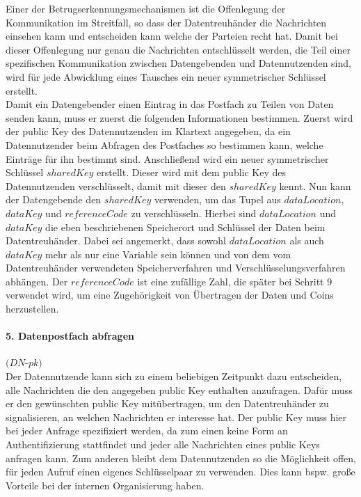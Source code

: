 \documentclass[11pt,a4paper]{scrreprt}
\begin{document}
Einer der Betrugserkennungsmechanismen ist die Offenlegung der Kommunikation im Streitfall, so dass der Datentreuhänder die Nachrichten einsehen kann und entscheiden kann welche der Parteien recht hat. Damit bei dieser Offenlegung nur genau die Nachrichten entschlüsselt werden, die Teil einer spezifischen Kommunikation zwischen Datengebenden und Datennutzenden sind, wird für jede Abwicklung eines Tausches ein neuer symmetrischer Schlüssel erstellt.\\

Damit ein Datengebender einen Eintrag in das Postfach zu Teilen von Daten senden kann, muss er zuerst die folgenden Informationen bestimmen. Zuerst wird der public Key des Datennutzenden im Klartext angegeben, da ein Datennutzender beim Abfragen des Postfaches so bestimmen kann, welche Einträge für ihn bestimmt sind. Anschließend wird ein neuer symmetrischer Schlüssel $sharedKey$ erstellt. Dieser wird mit dem public Key des Datennutzenden verschlüsselt, damit mit dieser den $sharedKey$ kennt. Nun kann der Datengebende den $sharedKey$ verwenden, um das Tupel aus $dataLocation$, $dataKey$ und $referenceCode$ zu verschlüsseln. Hierbei sind $dataLocation$ und $dataKey$ die eben beschriebenen Speicherort und Schlüssel der Daten beim Datentreuhänder. Dabei sei angemerkt, dass sowohl $dataLocation$ als auch $dataKey$ mehr als nur eine Variable sein können und von dem vom Datentreuhänder verwendeten Speicherverfahren und Verschlüsselungsverfahren abhängen. Der $referenceCode$ ist eine zufällige Zahl, die später bei Schritt 9 verwendet wird, um eine Zugehörigkeit von Übertragen der Daten und Coins herzustellen.

\paragraph{5. Datenpostfach abfragen} $(DN$-$pk)$\\
Der Datennutzende kann sich zu einem beliebigen Zeitpunkt dazu entscheiden, alle Nachrichten die den angegeben public Key enthalten anzufragen. Dafür muss er den gewünschten public Key mitübertragen, um den Datentreuhänder zu signalisieren, an welchen Nachrichten er interesse hat. Der public Key muss hier bei jeder Anfrage spezifiziert werden, da zum einen keine Form an Authentifizierung stattfindet und jeder alle Nachrichten eines public Keys anfragen kann. Zum anderen bleibt dem Datennutzenden so die Möglichkeit offen, für jeden Aufruf einen eigenes Schlüsselpaar zu verwenden. Dies kann bspw. große Vorteile bei der internen Organisierung haben.
\end{document}
